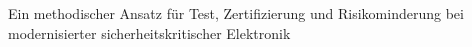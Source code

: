 Ein methodischer Ansatz für Test, Zertifizierung und Risikominderung bei modernisierter sicherheitskritischer Elektronik